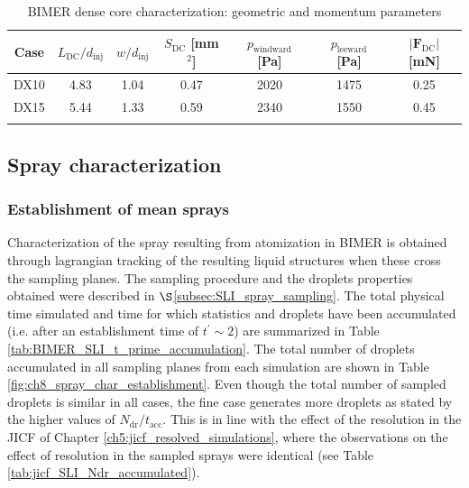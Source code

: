 \begin{table}[!h]
\centering
\caption{BIMER dense core characterization: geometric and momentum parameters}
\begin{tabular}{ccccccc}
\thickhline
\textbf{Case} &   $L_\mathrm{DC}/d_\mathrm{inj}$ & $w/d_\mathrm{inj}$ & $S_\mathrm{DC}$ [mm$^2$] & $p_\mathrm{windward}$ [Pa] & $p_\mathrm{leeward}$ [Pa]  & $|\boldsymbol{F}_\mathrm{DC}|$ [mN] \\  
\hline
DX10 & 4.83 & 1.04 & 0.47 & 2020 & 1475 & 0.25 \\
DX15 & 5.44 & 1.33 & 0.59 & 2340 & 1550 & 0.45 \\
\thickhline
\end{tabular}
\label{tab:BIMER_dense_core_characterization}
\end{table}




\subsection{Spray characterization}
\label{subsec:ch8_BIMER_spray_char}

\subsubsection*{Establishment of mean sprays}

Characterization of the spray resulting from atomization in BIMER is obtained through lagrangian tracking of the resulting liquid structures when these cross the sampling planes. The sampling procedure and the droplets properties obtained were described in $\S$\ref{subsec:SLI_spray_sampling}. The total physical time simulated and time for which statistics and droplets have been accumulated (i.e. after an establishment time of $t^\prime \sim 2$) are summarized in Table \ref{tab:BIMER_SLI_t_prime_accumulation}.  The total number of droplets accumulated in all sampling planes from each simulation are shown in Table \ref{fig:ch8_spray_char_establishment}. Even though the total number of sampled droplets is similar in all cases, the fine case generates more droplets as stated by the higher values of $N_\mathrm{dr}/t_\mathrm{acc}$. This is in line with the effect of the resolution in the JICF of Chapter \ref{ch5:jicf_resolved_simulations}, where the observations on the effect of resolution in the sampled sprays were identical (see Table \ref{tab:jicf_SLI_Ndr_accumulated}). 

